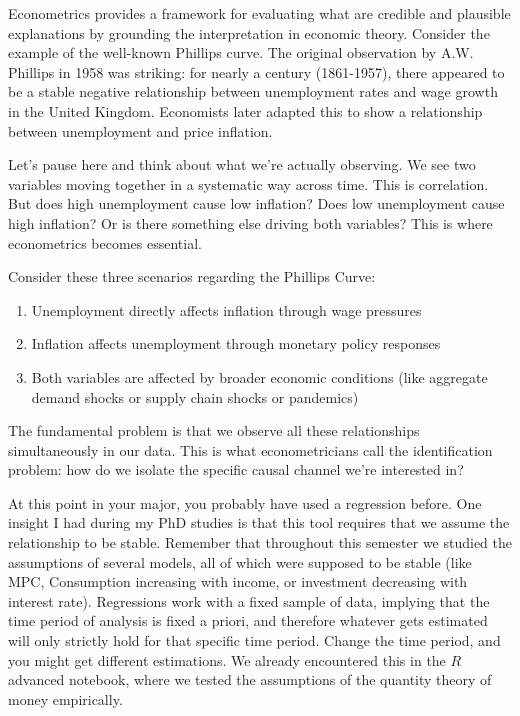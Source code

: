 \documentclass[10pt]{article}
\begin{document}
Econometrics provides a framework for evaluating what are credible and plausible explanations by grounding the interpretation in economic theory. Consider the example of the well-known Phillips curve. The original observation by A.W. Phillips in 1958 was striking: for nearly a century (1861-1957), there appeared to be a stable negative relationship between unemployment rates and wage growth in the United Kingdom. Economists later adapted this to show a relationship between unemployment and price inflation.

Let's pause here and think about what we're actually observing. We see two variables moving together in a systematic way across time. This is correlation. But does high unemployment cause low inflation? Does low unemployment cause high inflation? Or is there something else driving both variables? This is where econometrics becomes essential.

Consider these three scenarios regarding the Phillips Curve:

\begin{enumerate}
  \item Unemployment directly affects inflation through wage pressures
  \item Inflation affects unemployment through monetary policy responses
  \item Both variables are affected by broader economic conditions (like aggregate demand shocks or supply chain shocks or pandemics)
\end{enumerate}

The fundamental problem is that we observe all these relationships simultaneously in our data. This is what econometricians call the identification problem: how do we isolate the specific causal channel we're interested in?

At this point in your major, you probably have used a regression before. One insight I had during my PhD studies is that this tool requires that we assume the relationship to be stable. Remember that throughout this semester we studied the assumptions of several models, all of which were supposed to be stable (like MPC, Consumption increasing with income, or investment decreasing with interest rate). Regressions work with a fixed sample of data, implying that the time period of analysis is fixed a priori, and therefore whatever gets estimated will only strictly hold for that specific time period. Change the time period, and you might get different estimations. We already encountered this in the $R$ advanced notebook, where we tested the assumptions of the quantity theory of money empirically.
\end{document}
